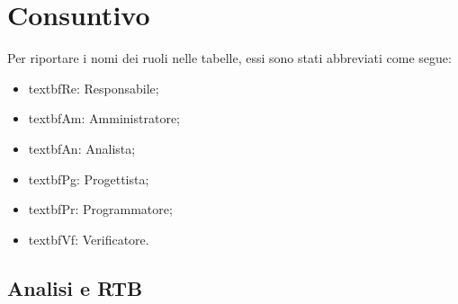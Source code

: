 \section{Consuntivo}

Per riportare i nomi dei ruoli nelle tabelle, essi sono stati abbreviati come segue:
\begin{itemize}
  \item textbf{Re:} Responsabile;
  \item textbf{Am:} Amministratore;
  \item textbf{An:} Analista;
  \item textbf{Pg:} Progettista;
  \item textbf{Pr:} Programmatore;
  \item textbf{Vf:} Verificatore.
\end{itemize}

\subsection{Analisi e RTB}


% 

% 

% 
